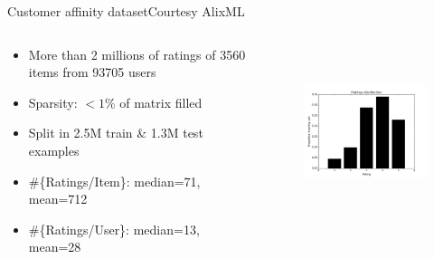 \documentclass{beamer} %
\begin{document}
\begin{frame}{Customer affinity dataset}{Courtesy AlixML}
\begin{columns}
\begin{column}{0.5\textwidth}
\begin{itemize}
\item More than 2 millions of ratings of 3560 items from 93705 users
\item Sparsity:  $<1$\% of matrix filled
\item Split in 2.5M train \& 1.3M test examples
\item \#\{Ratings/Item\}: median=71, mean=712
\item \#\{Ratings/User\}: median=13, mean=28
\end{itemize}
\end{column}
\begin{column}{0.5\textwidth}  %
    \begin{center}
    \begin{figure}
      \includegraphics[height=5cm]{images/ratings.png}
    \end{figure}
     \end{center}
\end{column}
\end{columns}
\end{frame}




 
\end{document}
